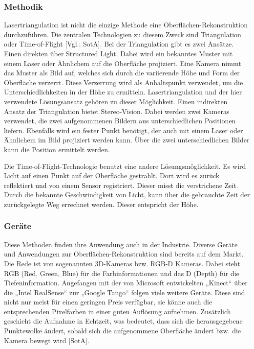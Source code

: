 		\subsubsection{Methodik}
		Lasertriangulation ist nicht die einzige Methode eine Oberflächen-Rekonstruktion  \linebreak durchzuführen. Die zentralen Technologien zu diesem Zweck sind Triangulation oder Time-of-Flight [Vgl.: SotA]. 
		Bei der Triangulation gibt es zwei Ansätze. Einen direkten über Structured Light. Dabei wird ein bekanntes Muster mit einem Laser oder Ähnlichem auf die Oberfläche projiziert. Eine Kamera nimmt das Muster als Bild auf, welches sich durch die variierende Höhe und Form der Oberfläche verzerrt. Diese Verzerrung wird als Anhaltspunkt verwendet, um die Unterschiedlichkeiten in der Höhe zu ermitteln. Lasertriangulation und der hier verwendete Lösungsansatz gehören zu dieser Möglichkeit. 
		Einen indirekten Ansatz der Triangulation bietet Stereo-Vision. Dabei werden zwei Kameras verwendet, die zwei aufgenommenen Bildern aus unterschiedlichen Positionen liefern. Ebenfalls wird ein fester Punkt benötigt, der auch mit einem Laser oder Ähnlichem im Bild projiziert werden kann. Über die zwei unterschiedlichen Bilder kann die Position ermittelt werden.
		
		Die Time-of-Flight-Technologie benutzt eine andere Lösungsmöglichkeit. Es wird Licht auf einen Punkt auf der Oberfläche gestrahlt. Dort wird es zurück reflektiert und von einem Sensor registriert. Dieser misst die verstrichene Zeit. Durch die bekannte  \linebreak Geschwindigkeit von Licht, kann über die gebrauchte Zeit der zurückgelegte Weg errechnet werden. Dieser entspricht der Höhe.
	
		\subsubsection{Geräte}
		Diese Methoden finden ihre Anwendung auch in der Industrie. Diverse Geräte und Anwendungen zur Oberflächen-Rekonstruktion sind bereits auf dem Markt. Die Rede ist von sogenannten 3D-Kameras bzw. RGB-D Kameras. Dabei steht RGB (Red, Green, Blue) für die Farbinformationen und das D (Depth) für die Tiefeninformation. Angefangen mit der von Microsoft entwickelten „Kinect“ über die „Intel RealSense“ zur „Google Tango“ folgen viele weitere Geräte. Diese sind nicht nur meist für einen geringen Preis verfügbar, sie könne auch die entsprechenden Pixelfarben in einer guten Auflösung  \linebreak aufnehmen.
		Zusätzlich geschieht die Aufnahme in Echtzeit, was bedeutet, dass sich die herausgegebene Punktewolke ändert, sobald sich die aufgenommene Oberfläche ändert bzw. die Kamera bewegt wird [SotA].
			
